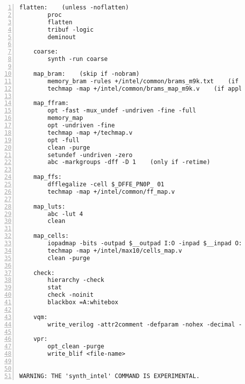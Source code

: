 \begin{lstlisting}[numbers=left,frame=single]
    flatten:    (unless -noflatten)
        proc
        flatten
        tribuf -logic
        deminout

    coarse:
        synth -run coarse

    map_bram:    (skip if -nobram)
        memory_bram -rules +/intel/common/brams_m9k.txt    (if applicable for family)
        techmap -map +/intel/common/brams_map_m9k.v    (if applicable for family)

    map_ffram:
        opt -fast -mux_undef -undriven -fine -full
        memory_map
        opt -undriven -fine
        techmap -map +/techmap.v
        opt -full
        clean -purge
        setundef -undriven -zero
        abc -markgroups -dff -D 1    (only if -retime)

    map_ffs:
        dfflegalize -cell $_DFFE_PN0P_ 01
        techmap -map +/intel/common/ff_map.v

    map_luts:
        abc -lut 4
        clean

    map_cells:
        iopadmap -bits -outpad $__outpad I:O -inpad $__inpad O:I    (if -iopads)
        techmap -map +/intel/max10/cells_map.v
        clean -purge

    check:
        hierarchy -check
        stat
        check -noinit
        blackbox =A:whitebox

    vqm:
        write_verilog -attr2comment -defparam -nohex -decimal -renameprefix syn_ <file-name>

    vpr:
        opt_clean -purge
        write_blif <file-name>


WARNING: THE 'synth_intel' COMMAND IS EXPERIMENTAL.
\end{lstlisting}

